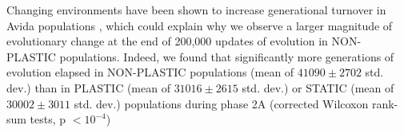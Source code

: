 Changing environments have been shown to increase generational turnover in Avida populations \citep{canino-koning_evolution_2016}, which could explain why we observe a larger magnitude of evolutionary change at the end of 200,000 updates of evolution in NON-PLASTIC populations. %
Indeed, we found that significantly more generations of evolution elapsed in NON-PLASTIC populations (mean of $41090\pm2702$ std. dev.) than in PLASTIC (mean of $31016\pm2615$ std. dev.) or STATIC (mean of $30002\pm3011$ std. dev.) populations during phase 2A (corrected Wilcoxon rank-sum tests, p $<10^{-4}$) %


